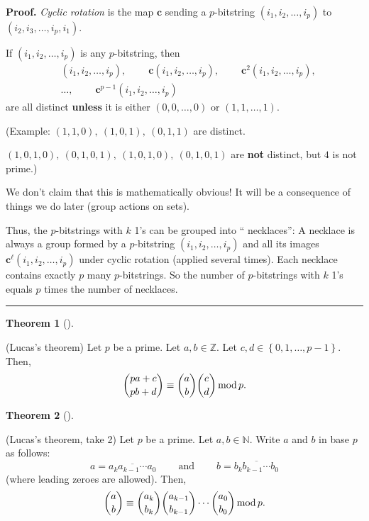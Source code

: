 \documentclass[numbers=enddot,12pt,final,onecolumn,notitlepage]{scrartcl}%
\numberwithin{exer}{subsection}
\theoremstyle{definition}
\newtheorem{theo}{Theorem}[subsection]
\newenvironment{theorem}[1][]
{\begin{theo}[#1]\begin{leftbar}}
{\end{leftbar}\end{theo}}
\newenvironment{proof}[1][Proof]{\noindent\textbf{#1.} }{\ \rule{0.5em}{0.5em}}
\begin{document}
\begin{proof}
\textit{Cyclic rotation} is the map $\mathbf{c}$ sending a $p$-bitstring
$\left(  i_{1},i_{2},\ldots,i_{p}\right)  $ to $\left(  i_{2},i_{3}%
,\ldots,i_{p},i_{1}\right)  $.

If $\left(  i_{1},i_{2},\ldots,i_{p}\right)  $ is any $p$-bitstring, then
\begin{align*}
&  \left(  i_{1},i_{2},\ldots,i_{p}\right)  ,\ \ \ \ \ \ \ \ \ \ \mathbf{c}%
\left(  i_{1},i_{2},\ldots,i_{p}\right)  ,\ \ \ \ \ \ \ \ \ \ \mathbf{c}%
^{2}\left(  i_{1},i_{2},\ldots,i_{p}\right)  ,\\
&  \ldots,\ \ \ \ \ \ \ \ \ \ \mathbf{c}^{p-1}\left(  i_{1},i_{2},\ldots
,i_{p}\right)
\end{align*}
are all distinct \textbf{unless} it is either $\left(  0,0,\ldots,0\right)  $
or $\left(  1,1,\ldots,1\right)  $.

(Example: $\left(  1,1,0\right)  ,\ \left(  1,0,1\right)  ,\ \left(
0,1,1\right)  $ are distinct.

$\left(  1,0,1,0\right)  ,\ \left(  0,1,0,1\right)  ,\ \left(  1,0,1,0\right)
,\ \left(  0,1,0,1\right)  $ are \textbf{not} distinct, but $4$ is not prime.)

We don't claim that this is mathematically obvious! It will be a consequence
of things we do later (group actions on sets).

Thus, the $p$-bitstrings with $k$ 1's can be grouped into \textquotedblleft
necklaces\textquotedblright: A necklace is always a group formed by a
$p$-bitstring $\left(  i_{1},i_{2},\ldots,i_{p}\right)  $ and all its images
$\mathbf{c}^{\ell}\left(  i_{1},i_{2},\ldots,i_{p}\right)  $ under cyclic
rotation (applied several times). Each necklace contains exactly $p$ many
$p$-bitstrings. So the number of $p$-bitstrings with $k$ 1's equals $p$ times
the number of necklaces.
\end{proof}

\begin{theorem}
(Lucas's theorem) Let $p$ be a prime. Let $a,b\in\mathbb{Z}$. Let
$c,d\in\left\{  0,1,\ldots,p-1\right\}  $. Then,%
\[
\dbinom{pa+c}{pb+d}\equiv\dbinom{a}{b}\dbinom{c}{d}\operatorname{mod}p.
\]

\end{theorem}

\begin{theorem}
(Lucas's theorem, take 2) Let $p$ be a prime. Let $a,b\in\mathbb{N}$. Write
$a$ and $b$ in base $p$ as follows:%
\[
a=\overline{a_{k}a_{k-1}\cdots a_{0}}\ \ \ \ \ \ \ \ \ \ \text{and}%
\ \ \ \ \ \ \ \ \ \ b=\overline{b_{k}b_{k-1}\cdots b_{0}}%
\]
(where leading zeroes are allowed). Then,%
\[
\dbinom{a}{b}\equiv\dbinom{a_{k}}{b_{k}}\dbinom{a_{k-1}}{b_{k-1}}\cdots
\dbinom{a_{0}}{b_{0}}\operatorname{mod}p.
\]

\end{theorem}
\end{document}
